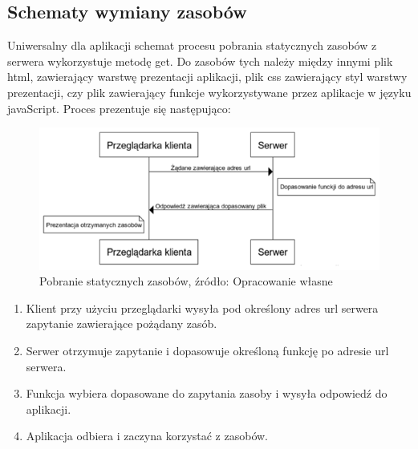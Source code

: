 \documentclass[12pt]{report}
\begin{document}
\subsection{Schematy wymiany zasobów}
Uniwersalny dla aplikacji schemat procesu pobrania statycznych zasobów z serwera wykorzystuje metodę get.
Do zasobów tych należy między innymi plik html, zawierający warstwę prezentacji aplikacji, plik css zawierający styl warstwy prezentacji, czy plik zawierający funkcje wykorzystywane przez aplikacje w języku javaScript.
Proces prezentuje się następująco:
\begin{figure}[!hb]
\centering
\includegraphics[width=\textwidth,height=\textheight,keepaspectratio]{K-S.png} 
\caption{Pobranie statycznych zasobów, źródło: Opracowanie własne}
\end{figure}
\begin{enumerate}
\item Klient przy użyciu przeglądarki wysyła pod określony adres url serwera zapytanie zawierające pożądany zasób.
\item Serwer otrzymuje zapytanie i dopasowuje określoną funkcję po adresie url serwera.
\item Funkcja wybiera dopasowane do zapytania zasoby i wysyła odpowiedź do aplikacji.
\item Aplikacja odbiera i zaczyna korzystać z zasobów.
\end{enumerate}
\end{document}
